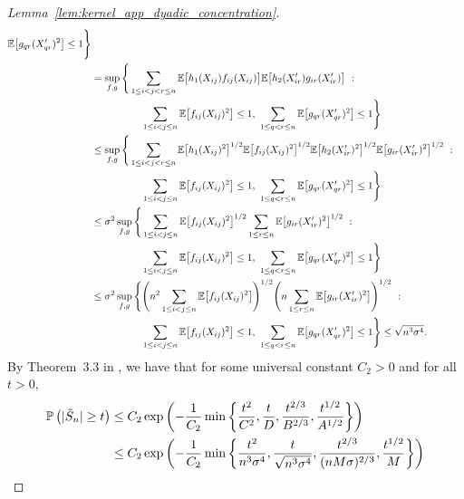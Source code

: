 \begin{proof}[Lemma~\ref{lem:kernel_app_dyadic_concentration}]
\begin{align*}
      \E\big[g_{qr}(X'_{qr})^2\big]
      \leq 1
    \Bigg\} \\
    &=
    \sup_{f,g} \Bigg\{
      \sum_{1 \leq i < j < r \leq n}
      \E\big[
        h_1(X_{i j})
        f_{i j}(X_{i j})
      \big]
      \E\big[
        h_2(X'_{i r})
        g_{i r}(X'_{i r})
      \big]
      \ : \\
      &\qquad\qquad\quad
      \sum_{1 \leq i < j \leq n}
      \E\big[f_{i j}(X_{i j})^2\big]
      \leq 1, \
      \sum_{1 \leq q < r \leq n}
      \E\big[g_{qr}(X'_{qr})^2\big]
      \leq 1
    \Bigg\} \\
    &\leq
    \sup_{f,g} \Bigg\{
      \sum_{1 \leq i < j < r \leq n}
      \E\big[ h_1(X_{i j})^2 \big]^{1/2}
      \E\big[ f_{i j}(X_{i j})^2 \big]^{1/2}
      \E\big[ h_2(X_{i r}')^2 \big]^{1/2}
      \E\big[ g_{i r}(X'_{i r})^2 \big]^{1/2}
      \ : \\
      &\qquad\qquad\quad
      \sum_{1 \leq i < j \leq n}
      \E\big[f_{i j}(X_{i j})^2\big]
      \leq 1, \
      \sum_{1 \leq q < r \leq n}
      \E\big[g_{qr}(X'_{qr})^2\big]
      \leq 1
    \Bigg\} \\
    &\leq
    \sigma^2
    \sup_{f,g} \Bigg\{
      \sum_{1 \leq i < j \leq n}
      \E\big[ f_{i j}(X_{i j})^2 \big]^{1/2}
      \sum_{1 \leq r \leq n }
      \E\big[ g_{i r}(X'_{i r})^2 \big]^{1/2}
      \ : \\
      &\qquad\qquad\quad
      \sum_{1 \leq i < j \leq n}
      \E\big[f_{i j}(X_{i j})^2\big]
      \leq 1, \
      \sum_{1 \leq q < r \leq n}
      \E\big[g_{qr}(X'_{qr})^2\big]
      \leq 1
    \Bigg\} \\
    &\leq
    \sigma^2
    \sup_{f,g} \Bigg\{
      \Bigg(
        n^2
        \sum_{1 \leq i < j \leq n}
        \E\big[ f_{i j}(X_{i j})^2 \big]
      \Bigg)^{1/2}
      \Bigg(
        n
        \sum_{1 \leq r \leq n }
        \E\big[ g_{i r}(X'_{i r})^2 \big]
      \Bigg)^{1/2}
      \ : \\
      &\qquad\qquad\quad
      \sum_{1 \leq i < j \leq n}
      \E\big[f_{i j}(X_{i j})^2\big]
      \leq 1, \
      \sum_{1 \leq q < r \leq n}
      \E\big[g_{qr}(X'_{qr})^2\big]
      \leq 1
    \Bigg\}
    \leq
    \sqrt{n^3 \sigma^4}.
  \end{align*}
  \endgroup
  By Theorem~3.3 in
  \citet{gine2000exponential},
  we have that for some universal constant
  $C_2 > 0$
  and for all $t > 0$,
  \begin{align*}
    \P\left(
      |\tilde S_n| \geq t
    \right)
    &\leq
    C_2 \exp\left(
      -\frac{1}{C_2}
      \min \left\{
        \frac{t^2}{C^2},
        \frac{t}{D},
        \frac{t^{2/3}}{B^{2/3}},
        \frac{t^{1/2}}{A^{1/2}}
      \right\}
    \right) \\
    &\leq
    C_2 \exp\left(
      -\frac{1}{C_2}
      \min \left\{
        \frac{t^2}{n^3 \sigma^4},
        \frac{t}{\sqrt{n^3 \sigma^4}},
        \frac{t^{2/3}}{(n M \sigma)^{2/3}},
        \frac{t^{1/2}}{M}
      \right\}
    \right)
  \end{align*}


\end{proof}
